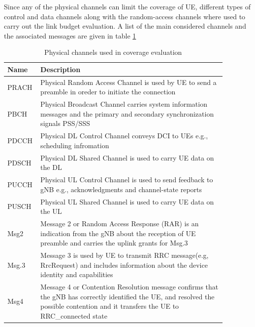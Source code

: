 \documentclass[conference]{IEEEtran}
\begin{document}
Since any of the physical channels can limit the coverage of UE, different types of control and data channels along with the random-access channels where used to carry out the link budget evaluation. A list of the main considered channels and the associated messages are given in table \ref{table:coverage-evaluation-physical-channels}
\begin{table}
\centering
\caption{Physical channels used in coverage evaluation}
\begin{tabular}{| m{0.08\linewidth}  m{0.8\linewidth}|} 
 \hline
    \textbf{Name}  &  \textbf{Description} \\
\hline
    PRACH & Physical Random Access Channel is used by UE to send a preamble in oreder to initiate the connection\\
\hline
    PBCH & Physical Broadcast Channel carries system information messages and the primary and secondary synchronization signals PSS/SSS\\
\hline
    PDCCH & Physical DL Control Channel conveys DCI to UEs e.g., scheduling infromation\\
\hline
    PDSCH &  Physical DL Shared Channel is used to carry UE data on the DL\\
\hline
    PUCCH &  Physical UL Control Channel is used to send feedback to gNB e.g., acknowledgments and channel-state reports\\
\hline
    PUSCH &  Physical UL Shared Channel is used to carry UE data on the UL\\
\hline
    Msg2 &  Message 2 or Random Access Response (RAR) is an indication from the gNB about the reception of UE preamble and carries the uplink grants for Msg.3\\
\hline
    Msg.3 &  Message 3 is used by UE to transmit RRC message(e.g, RrcRequest) and includes information about the device identity and capabilities\\ 
\hline
    Msg4 &  Message 4 or Contention Resolution message confirms that the gNB has correctly identified the UE, and resolved the possible contention and it transfers the UE to RRC\_connected state\\
\hline
\end{tabular}
\label{table:coverage-evaluation-physical-channels}
\end{table}
\end{document}
